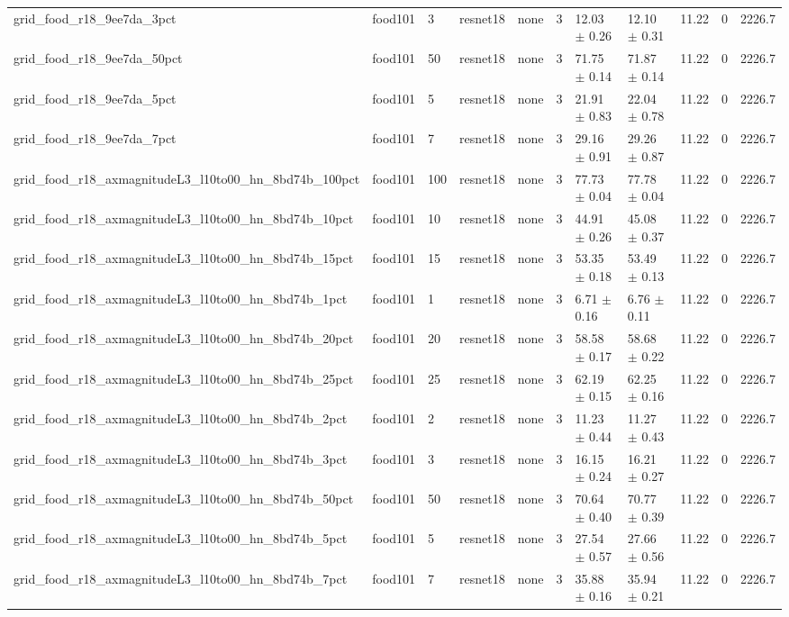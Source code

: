 \begin{tabular}{lllllllllll}
grid_food_r18_9ee7da_3pct & food101 & 3 & resnet18 & none & 3 & 12.03 $\pm$ 0.26 & 12.10 $\pm$ 0.31 & 11.22 & 0 & 2226.7 \\
grid_food_r18_9ee7da_50pct & food101 & 50 & resnet18 & none & 3 & 71.75 $\pm$ 0.14 & 71.87 $\pm$ 0.14 & 11.22 & 0 & 2226.7 \\
grid_food_r18_9ee7da_5pct & food101 & 5 & resnet18 & none & 3 & 21.91 $\pm$ 0.83 & 22.04 $\pm$ 0.78 & 11.22 & 0 & 2226.7 \\
grid_food_r18_9ee7da_7pct & food101 & 7 & resnet18 & none & 3 & 29.16 $\pm$ 0.91 & 29.26 $\pm$ 0.87 & 11.22 & 0 & 2226.7 \\
grid_food_r18_axmagnitudeL3_l10to00_hn_8bd74b_100pct & food101 & 100 & resnet18 & none & 3 & 77.73 $\pm$ 0.04 & 77.78 $\pm$ 0.04 & 11.22 & 0 & 2226.7 \\
grid_food_r18_axmagnitudeL3_l10to00_hn_8bd74b_10pct & food101 & 10 & resnet18 & none & 3 & 44.91 $\pm$ 0.26 & 45.08 $\pm$ 0.37 & 11.22 & 0 & 2226.7 \\
grid_food_r18_axmagnitudeL3_l10to00_hn_8bd74b_15pct & food101 & 15 & resnet18 & none & 3 & 53.35 $\pm$ 0.18 & 53.49 $\pm$ 0.13 & 11.22 & 0 & 2226.7 \\
grid_food_r18_axmagnitudeL3_l10to00_hn_8bd74b_1pct & food101 & 1 & resnet18 & none & 3 & 6.71 $\pm$ 0.16 & 6.76 $\pm$ 0.11 & 11.22 & 0 & 2226.7 \\
grid_food_r18_axmagnitudeL3_l10to00_hn_8bd74b_20pct & food101 & 20 & resnet18 & none & 3 & 58.58 $\pm$ 0.17 & 58.68 $\pm$ 0.22 & 11.22 & 0 & 2226.7 \\
grid_food_r18_axmagnitudeL3_l10to00_hn_8bd74b_25pct & food101 & 25 & resnet18 & none & 3 & 62.19 $\pm$ 0.15 & 62.25 $\pm$ 0.16 & 11.22 & 0 & 2226.7 \\
grid_food_r18_axmagnitudeL3_l10to00_hn_8bd74b_2pct & food101 & 2 & resnet18 & none & 3 & 11.23 $\pm$ 0.44 & 11.27 $\pm$ 0.43 & 11.22 & 0 & 2226.7 \\
grid_food_r18_axmagnitudeL3_l10to00_hn_8bd74b_3pct & food101 & 3 & resnet18 & none & 3 & 16.15 $\pm$ 0.24 & 16.21 $\pm$ 0.27 & 11.22 & 0 & 2226.7 \\
grid_food_r18_axmagnitudeL3_l10to00_hn_8bd74b_50pct & food101 & 50 & resnet18 & none & 3 & 70.64 $\pm$ 0.40 & 70.77 $\pm$ 0.39 & 11.22 & 0 & 2226.7 \\
grid_food_r18_axmagnitudeL3_l10to00_hn_8bd74b_5pct & food101 & 5 & resnet18 & none & 3 & 27.54 $\pm$ 0.57 & 27.66 $\pm$ 0.56 & 11.22 & 0 & 2226.7 \\
grid_food_r18_axmagnitudeL3_l10to00_hn_8bd74b_7pct & food101 & 7 & resnet18 & none & 3 & 35.88 $\pm$ 0.16 & 35.94 $\pm$ 0.21 & 11.22 & 0 & 2226.7 \\

\end{tabular}
